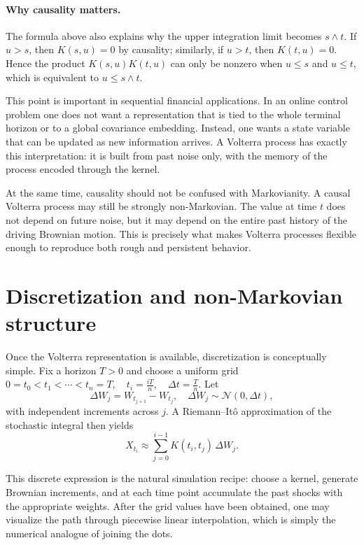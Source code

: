 \documentclass[a4paper,10pt,titlepage,oneside,openany]{book}
\theoremstyle{plain}
\theoremstyle{definition}
\theoremstyle{remark}
\newcommand{\1}{\mathbf{1}}
\begin{document}
\paragraph{Why causality matters.}

The formula above also explains why the upper integration limit becomes \(s\wedge t\). If \(u>s\), then \(K(s,u)=0\) by causality; similarly, if \(u>t\), then \(K(t,u)=0\). Hence the product \(K(s,u)K(t,u)\) can only be nonzero when \(u\le s\) and \(u\le t\), which is equivalent to \(u\le s\wedge t\).

This point is important in sequential financial applications. In an online control problem one does not want a representation that is tied to the whole terminal horizon or to a global covariance embedding. Instead, one wants a state variable that can be updated as new information arrives. A Volterra process has exactly this interpretation: it is built from past noise only, with the memory of the process encoded through the kernel.

At the same time, causality should not be confused with Markovianity. A causal Volterra process may still be strongly non-Markovian. The value at time \(t\) does not depend on future noise, but it may depend on the entire past history of the driving Brownian motion. This is precisely what makes Volterra processes flexible enough to reproduce both rough and persistent behavior.

\section{Discretization and non-Markovian structure}

Once the Volterra representation is available, discretization is conceptually simple. Fix a horizon \(T>0\) and choose a uniform grid
\(
0=t_0<t_1<\cdots<t_n=T,
\quad
t_i=\frac{iT}{n},
\quad
\Delta t=\frac{T}{n}.
\)
Let
\[
\Delta W_j = W_{t_{j+1}}-W_{t_j},
\quad
\Delta W_j\sim \mathcal{N}(0,\Delta t),
\]
with independent increments across \(j\). A Riemann--It\^o approximation of the stochastic integral then yields
\[
X_{t_i}
\approx
\sum_{j=0}^{i-1} K(t_i,t_j)\,\Delta W_j.
\]

This discrete expression is the natural simulation recipe: choose a kernel, generate Brownian increments, and at each time point accumulate the past shocks with the appropriate weights. After the grid values have been obtained, one may visualize the path through piecewise linear interpolation, which is simply the numerical analogue of joining the dots.
\end{document}
